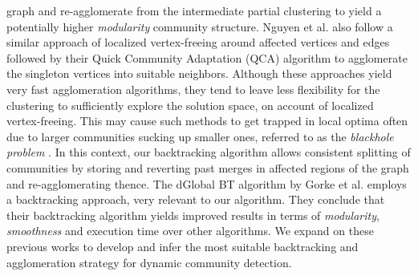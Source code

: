 \documentclass[conference]{IEEEtran}
\begin{document}
graph and re-agglomerate from the intermediate partial clustering to yield a 
potentially higher \emph{modularity} community structure. Nguyen et al. 
\cite{ngu} also follow a similar approach of localized vertex-freeing around 
affected vertices and edges followed by their Quick Community Adaptation (QCA) 
algorithm to agglomerate the singleton vertices into suitable neighbors. 
Although these approaches yield very fast agglomeration algorithms, they tend to 
leave less flexibility for the clustering to sufficiently explore the solution 
space, on account of localized vertex-freeing. This may cause such methods to 
get trapped in local optima often due to larger communities sucking up smaller 
ones, referred to as the \emph{blackhole problem} \cite{jwu}. In this context, 
our backtracking algorithm allows consistent splitting of communities by storing 
and reverting past merges in affected regions of the graph and re-agglomerating 
thence. The dGlobal BT algorithm by Gorke et al. \cite{gor} employs a  
backtracking approach, very relevant to our algorithm. They conclude that their 
backtracking algorithm yields improved results in terms of \emph{modularity}, 
\emph{smoothness} and execution time over other algorithms. We expand on these 
previous works \cite{rie, gor} to develop and infer the most suitable 
backtracking and agglomeration strategy for dynamic community detection.
\end{document}
